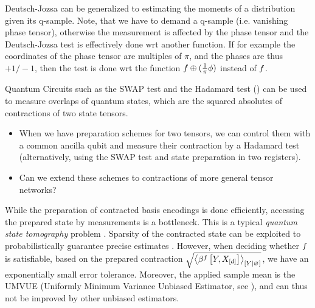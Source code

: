 

Deutsch-Jozsa can be generalized to estimating the moments of a distribution given its q-sample.
Note, that we have to demand a q-sample (i.e. vanishing phase tensor), otherwise the measurement is affected by the phase tensor and the Deutsch-Jozsa test is effectively done wrt another function.
If for example the coordinates of the phase tensor are multiples of $\pi$, and the phases are thus $+1/-1$, then the test is done wrt the function $f\oplus(\frac{1}{\pi}\phi)$ instead of $f$.



Quantum Circuits such as the SWAP test and the Hadamard test (\cite[Section 3.6.1]{schuld_machine_2021}) can be used to measure overlaps of quantum states, which are the squared absolutes of contractions of two state tensors.
\begin{itemize}
    \item When we have preparation schemes for two tensors, we can control them with a common ancilla qubit and measure their contraction by a Hadamard test (alternatively, using the SWAP test and state preparation in two registers).
    \item Can we extend these schemes to contractions of more general tensor networks?
\end{itemize}

While the preparation of contracted basis encodings is done efficiently, accessing the prepared state by measurements is a bottleneck.
This is a typical \emph{quantum state tomography} problem \cite{roth_semi-device-dependent_2023}.
Sparsity of the contracted state can be exploited to probabilistically guarantee precise estimates \cite{gross_quantum_2010}.
However, when deciding whether $f$ is satisfiable, based on the prepared contraction $\sqrt{\normalizationof{\bencodingofat{\exformula}{\headvariable,\shortcatvariables}}{\headvariable}}$, we have an exponentially small error tolerance.
Moreover, the applied sample mean is the UMVUE (Uniformly Minimum Variance Unbiased Estimator, see \cite{casella_statistical_2001}), and can thus not be improved by other unbiased estimators.

